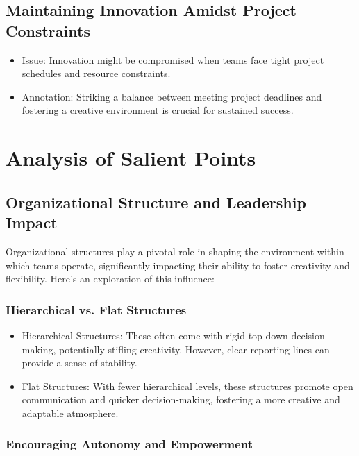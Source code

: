 \documentclass[a4paper, twoside]{article}
\begin{document}
\subsection{Maintaining Innovation Amidst Project Constraints}
\begin{itemize}
  \item{Issue}:  Innovation might be compromised when teams face tight project schedules and resource constraints.
  \item{Annotation}: Striking a balance between meeting project deadlines and fostering a creative environment is crucial for sustained success.\cite{Amabile2011}
\end{itemize}




\section{Analysis of Salient Points}

\subsection{Organizational Structure and Leadership Impact}
Organizational structures play a pivotal role in shaping the environment within which teams operate, significantly impacting their ability to foster creativity and flexibility. Here's an exploration of this influence:

\subsubsection{Hierarchical vs. Flat Structures}
\begin{itemize}
    \item{Hierarchical Structures:} These often come with rigid top-down decision-making, potentially stifling creativity. However, clear reporting lines can provide a sense of stability.
    \item{Flat Structures:} With fewer hierarchical levels, these structures promote open communication and quicker decision-making, fostering a more creative and adaptable atmosphere.
\end{itemize}




\subsubsection{Encouraging Autonomy and Empowerment}
\end{document}
